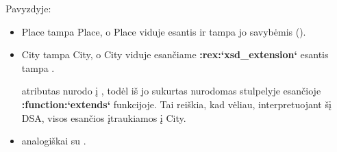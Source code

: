 \documentclass[letterpaper,10pt,lithuanian]{sphinxmanual}
\begin{document}
\sphinxAtStartPar
Pavyzdyje:
\begin{itemize}
\item {} 
\sphinxAtStartPar
{} Place tampa {\hyperref[\detokenize{formatas:model}]{}} Place, o  Place viduje esantis
{\hyperref[\detokenize{schemos/xsd:xsd-element}]{}}  ir {\hyperref[\detokenize{schemos/xsd:xsd-attribute}]{}}  tampa jo savybėmis ({\hyperref[\detokenize{formatas:property}]{}}).

\item {} 
\sphinxAtStartPar
{} City tampa {\hyperref[\detokenize{formatas:model}]{}} City, o  City viduje esančiame
{\color{red}\bfseries{}:rex:`xsd\_extension`} esantis {\hyperref[\detokenize{schemos/xsd:xsd-element}]{}}  tampa {\hyperref[\detokenize{formatas:property}]{}} .

\sphinxAtStartPar
{\hyperref[\detokenize{schemos/xsd:xsd-extension}]{}} {\hyperref[\detokenize{schemos/xsd:xsd-base}]{}} atributas nurodo į  , todėl
iš jo sukurtas {\hyperref[\detokenize{formatas:model}]{}}  nurodomas {\hyperref[\detokenize{formatas:model}]{}}   stulpelyje
esančioje {\color{red}\bfseries{}:function:`extends`} funkcijoje. Tai reiškia, kad vėliau, interpretuojant šį DSA,
visos {\hyperref[\detokenize{formatas:model}]{}}  esančios {\hyperref[\detokenize{formatas:property}]{}} įtraukiamos į {\hyperref[\detokenize{formatas:model}]{}} City.

\item {} 
\sphinxAtStartPar
analogiškai su .

\end{itemize}
\end{document}
